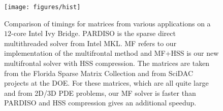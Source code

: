 \documentclass{article}
\newcommand{\tm}{\textsuperscript{\textregistered}}
\begin{document}
\begin{figure}
  \begin{center}
    \texttt{[image: figures/hist]}
  \end{center}    
  \caption{\footnotesize Comparison of timings for matrices from various
    applications on a $12$-core Intel\tm{} Ivy Bridge. PARDISO is the
    sparse direct multithreaded solver from Intel\tm{} MKL. MF refers
    to our implementation of the multifrontal method and MF+HSS is our
    new multifrontal solver with HSS compression. The matrices are
    taken from the Florida Sparse Matrix Collection and from SciDAC
    projects at the DOE. For these matrices, which are all quite large
    and from 2D/3D PDE problems, our MF solver is faster than PARDISO
    and HSS compression gives an additional speedup.}
  \label{fig:hist}
\end{figure}
\end{document}
